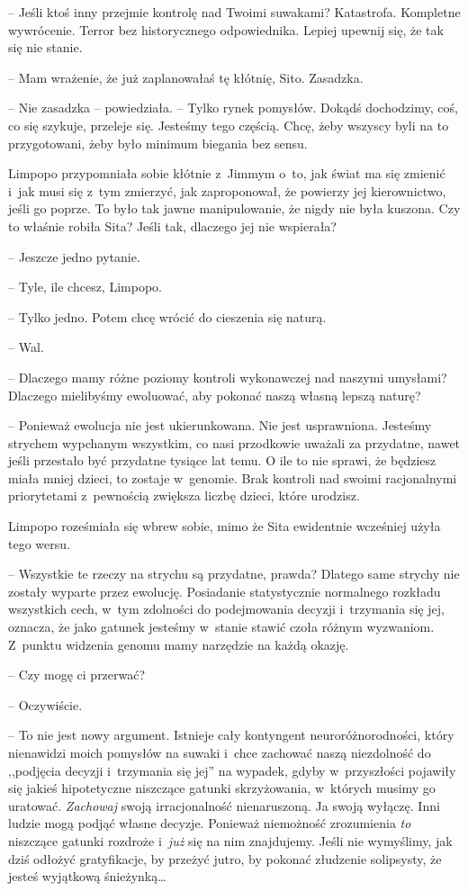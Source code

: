\documentclass[oneside,polish,11pt,sfheadings]{mwbk}
\begin{document}
-- Jeśli ktoś inny przejmie kontrolę nad Twoimi suwakami? Katastrofa.
Kompletne wywrócenie. Terror bez historycznego odpowiednika. Lepiej
upewnij się, że tak się nie stanie.

-- Mam wrażenie, że już zaplanowałaś tę kłótnię, Sito. Zasadzka.

-- Nie zasadzka -- powiedziała. -- Tylko rynek pomysłów. Dokądś dochodzimy,
coś, co się szykuje, przeleje się. Jesteśmy tego częścią. Chcę, żeby
wszyscy byli na to przygotowani, żeby było minimum biegania bez sensu.

Limpopo przypomniała sobie kłótnie z~Jimmym o~to, jak świat ma się
zmienić i~jak musi się z~tym zmierzyć, jak zaproponował, że powierzy jej
kierownictwo, jeśli go poprze. To było tak jawne manipulowanie, że nigdy
nie była kuszona. Czy to właśnie robiła Sita? Jeśli tak, dlaczego jej
nie wspierała?

-- Jeszcze jedno pytanie.

-- Tyle, ile chcesz, Limpopo.

-- Tylko jedno. Potem chcę wrócić do cieszenia się naturą.

-- Wal.

-- Dlaczego mamy różne poziomy kontroli wykonawczej nad naszymi umysłami?
Dlaczego mielibyśmy ewoluować, aby pokonać naszą własną lepszą naturę?

-- Ponieważ ewolucja nie jest ukierunkowana. Nie jest usprawniona.
Jesteśmy strychem wypchanym wszystkim, co nasi przodkowie uważali za
przydatne, nawet jeśli przestało być przydatne tysiące lat temu. O ile
to nie sprawi, że będziesz miała mniej dzieci, to zostaje w~genomie.
Brak kontroli nad swoimi racjonalnymi priorytetami z~pewnością zwiększa
liczbę dzieci, które urodzisz.

Limpopo roześmiała się wbrew sobie, mimo że Sita ewidentnie wcześniej
użyła tego wersu. 

-- Wszystkie te rzeczy na strychu są przydatne, prawda?
Dlatego same strychy nie zostały wyparte przez ewolucję. Posiadanie
statystycznie normalnego rozkładu wszystkich cech, w~tym zdolności do
podejmowania decyzji i~trzymania się jej, oznacza, że jako gatunek
jesteśmy w~stanie stawić czoła różnym wyzwaniom. Z~punktu widzenia
genomu mamy narzędzie na każdą okazję.

-- Czy mogę ci przerwać?

-- Oczywiście.

-- To nie jest nowy argument. Istnieje cały kontyngent
neuroróżnorodności, który nienawidzi moich pomysłów na suwaki i~chce
zachować naszą niezdolność do ,,podjęcia decyzji i~trzymania się jej''
na wypadek, gdyby w~przyszłości pojawiły się jakieś hipotetyczne
niszczące gatunki skrzyżowania, w~których musimy go uratować.
\textit{Zachowaj} swoją irracjonalność nienaruszoną. Ja swoją wyłączę.
Inni ludzie mogą podjąć własne decyzje. Ponieważ niemożność zrozumienia
\textit{to} niszczące gatunki rozdroże i~\textit{już} się na nim znajdujemy.
Jeśli nie wymyślimy, jak dziś odłożyć gratyfikacje, by przeżyć jutro, by
pokonać złudzenie solipsysty, że jesteś wyjątkową śnieżynką\ldots 
\end{document}

